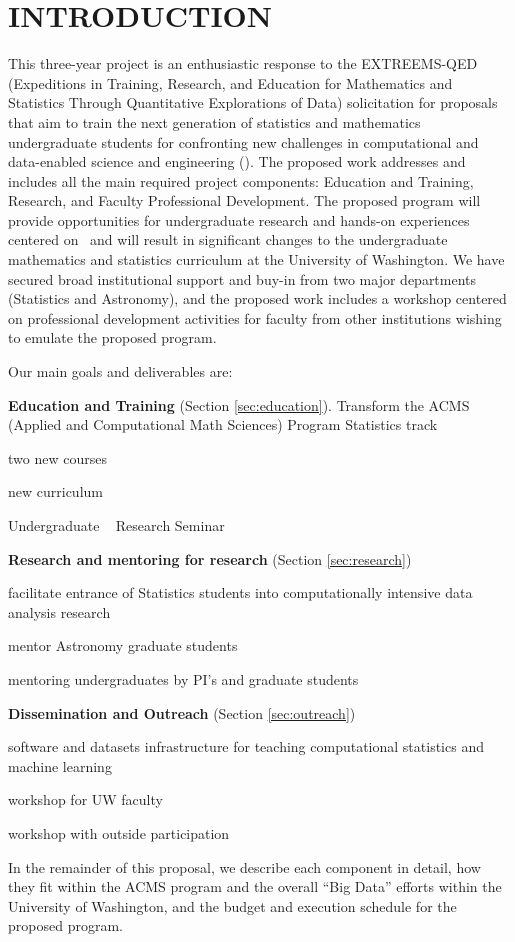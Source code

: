 \section{ INTRODUCTION}

This three-year project is an enthusiastic response to the EXTREEMS-QED (Expeditions in Training, Research, 
and Education for Mathematics and Statistics Through Quantitative Explorations of Data) solicitation for proposals
that aim to train the next generation of statistics and mathematics undergraduate students for confronting new
challenges in computational and data-enabled science and engineering (\cdse).  The proposed work addresses and 
includes all the main required project components: Education and Training, Research, and Faculty Professional 
Development. The proposed program will provide opportunities for undergraduate research and hands-on experiences 
centered on \cdse\ and will result in significant changes to the undergraduate mathematics and statistics curriculum 
at the University of Washington. We have secured broad institutional support and buy-in from two major departments 
(Statistics and Astronomy), and the proposed work includes a workshop centered on professional development activities
for faculty from other institutions wishing to emulate the proposed program. 

\vskip 0.2in Our main goals and deliverables are: 
\bits
\item {\bf Education and Training} (Section \ref{sec:education}).
Transform the ACMS (Applied and Computational Math Sciences) Program Statistics track
  \bits
  \item two new courses
  \item new curriculum 
  \item Undergraduate \cdse~ Research Seminar
  \eits
\item {\bf Research and mentoring for research} (Section \ref{sec:research})
  \bits
  \item facilitate entrance of Statistics students into computationally intensive data analysis research
  \item mentor Astronomy graduate students 
  \item mentoring undergraduates by PI's and graduate students
  \eits
\item {\bf Dissemination and Outreach} (Section \ref{sec:outreach})
  \bits
  \item software and datasets infrastructure for teaching computational statistics and machine learning 
  \item workshop for UW faculty %
  \item workshop with outside participation 
 \eits
\eits  


In the remainder of this proposal, we describe each component in
detail, how they fit within the ACMS program and the overall ``Big
Data'' efforts within the University of Washington, and the budget and
execution schedule for the proposed program.


